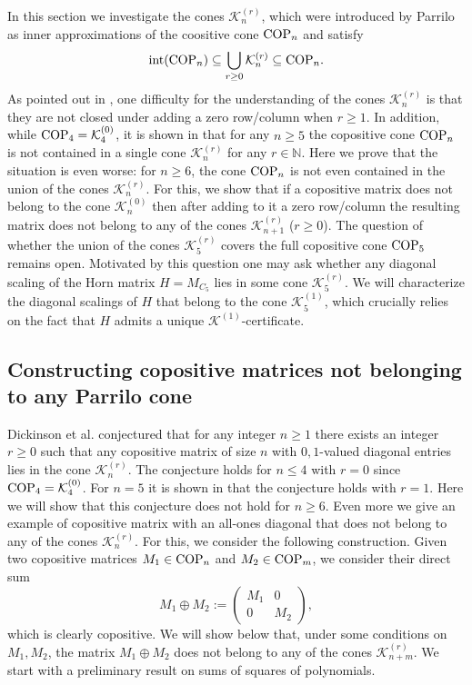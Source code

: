 \documentclass[11pt]{article}
\numberwithin{equation}{section}
\newcommand{\COP}{{\text{\rm COP}}}
\newcommand{\MK}{{\mathcal K}}
\begin{document}
In this section we  investigate %
 the cones $\MK_n^{(r)}$, which were introduced by Parrilo \cite{Parrilo-thesis-2000} as inner approximations of  the coositive cone $\COP_n$ and satisfy
$$\text{int}(\COP_n)\subseteq \bigcup_{r\ge 0} \MK^{(r)}_n\subseteq \COP_n.$$
 As pointed out  in \cite{ dKP2002,GL2007}, one difficulty for the understanding of the cones $\MK_n^{(r)}$ is that they are not closed under adding a zero row/column when $r\geq 1$. In addition, while $\COP_4=\MK^{(0)}_4$,  it is shown in \cite{DDGH} that for any $n\ge 5$ the copositive cone $\COP_n$ is not contained in  a single cone  $\MK^{(r)}_n$ for any $r\in \mathbb{N}$.  Here we prove that the situation is even worse: for $n\ge 6$, the cone $\COP_n$ is not even contained in the union of the cones $\MK^{(r)}_n$. For this, we show that if a copositive matrix does not belong to the cone $ \MK_n^{(0)}$ then after adding to it a zero row/column the resulting matrix  does not belong to any of the cones $\MK_{n+1}^{(r)}$ ($r\ge 0$). The question of whether the union of the cones $\MK^{(r)}_5$ covers the full copositive cone $\COP_5$ remains open. 
Motivated by this question one may ask whether any diagonal scaling of the Horn matrix $H=M_{C_5}$ lies in some cone $\MK^{(r)}_5$. We will characterize the diagonal scalings of  $H$ that belong to the cone $\MK^{(1)}_5$, which crucially relies on the fact  that $H$  admits a unique $\MK^{(1)}$-certificate.


\subsection{Constructing copositive matrices not belonging to any Parrilo cone }

Dickinson et al.  \cite{DDGH}  conjectured that for any integer $n\geq 1$ there exists an integer $r\ge 0$ such that any copositive matrix of size $n$ with $0,1$-valued diagonal entries lies in the cone $\MK^{(r)}_n$. The conjecture holds  for $n\leq 4$ with $r=0$ since %
$\COP_4=\MK_4^{(0)}$.
For $n=5$ it is shown in \cite{DDGH} that the conjecture  holds with $r=1$. 
Here we will show that this conjecture does not hold for $n\ge 6$. Even more we give an example of copositive matrix with an all-ones diagonal that does not belong to any of the cones $\MK^{(r)}_n$.
For this, we consider the following construction. Given two copositive matrices $M_1\in \COP_n$ and $M_2\in \COP_m$, we consider their direct sum
\begin{equation}
M_1\oplus M_2 := \left(\begin{array}{c|c}
M_1 & 0\\
\hline
0 & M_2
\end{array}\right),
\end{equation}
which is clearly copositive.
We will show below that, under some conditions on $M_1,M_2$, the matrix $M_1\oplus M_2$ does not belong to any of the cones $\MK_{n+m}^{(r)}$. We start with a preliminary result on sums of squares of polynomials. 
\end{document}
